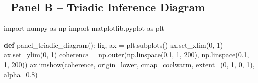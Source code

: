 \documentclass[
  11pt,
]{article}
\newenvironment{Shaded}{\begin{snugshade}}{\end{snugshade}}
\newcommand{\DecValTok}[1]{\textcolor[rgb]{0.68,0.00,0.00}{#1}}
\newcommand{\FloatTok}[1]{\textcolor[rgb]{0.68,0.00,0.00}{#1}}
\newcommand{\ImportTok}[1]{\textcolor[rgb]{0.00,0.46,0.62}{#1}}
\newcommand{\KeywordTok}[1]{\textcolor[rgb]{0.00,0.23,0.31}{\textbf{#1}}}
\newcommand{\NormalTok}[1]{\textcolor[rgb]{0.00,0.23,0.31}{#1}}
\newcommand{\OperatorTok}[1]{\textcolor[rgb]{0.37,0.37,0.37}{#1}}
\newcommand{\StringTok}[1]{\textcolor[rgb]{0.13,0.47,0.30}{#1}}
\begin{document}
\subsection{🧩 Panel B -- Triadic Inference
Diagram}\label{panel-b-triadic-inference-diagram}

\begin{Shaded}
\begin{Highlighting}[]
\ImportTok{import}\NormalTok{ numpy }\ImportTok{as}\NormalTok{ np}
\ImportTok{import}\NormalTok{ matplotlib.pyplot }\ImportTok{as}\NormalTok{ plt}

\KeywordTok{def}\NormalTok{ panel\_triadic\_diagram():}
\NormalTok{    fig, ax }\OperatorTok{=}\NormalTok{ plt.subplots()}
\NormalTok{    ax.set\_xlim(}\DecValTok{0}\NormalTok{, }\DecValTok{1}\NormalTok{)}
\NormalTok{    ax.set\_ylim(}\DecValTok{0}\NormalTok{, }\DecValTok{1}\NormalTok{)}
\NormalTok{    coherence }\OperatorTok{=}\NormalTok{ np.outer(np.linspace(}\FloatTok{0.1}\NormalTok{, }\DecValTok{1}\NormalTok{, }\DecValTok{200}\NormalTok{), np.linspace(}\FloatTok{0.1}\NormalTok{, }\DecValTok{1}\NormalTok{, }\DecValTok{200}\NormalTok{))}
\NormalTok{    ax.imshow(coherence, origin}\OperatorTok{=}\StringTok{\textquotesingle{}lower\textquotesingle{}}\NormalTok{, cmap}\OperatorTok{=}\StringTok{\textquotesingle{}coolwarm\textquotesingle{}}\NormalTok{, extent}\OperatorTok{=}\NormalTok{(}\DecValTok{0}\NormalTok{, }\DecValTok{1}\NormalTok{, }\DecValTok{0}\NormalTok{, }\DecValTok{1}\NormalTok{), alpha}\OperatorTok{=}\FloatTok{0.8}\NormalTok{)}
    

\end{Highlighting}
\end{Shaded}
\end{document}
